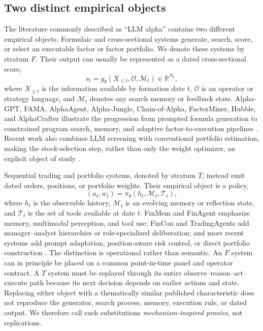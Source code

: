 \subsection{Two distinct empirical objects}

The literature commonly described as ``LLM alpha'' contains two different
empirical objects.  Formulaic and cross-sectional systems generate, search,
score, or select an executable factor or factor portfolio.  We denote these
systems by stratum \(F\).  Their output can usually be represented as a dated
cross-sectional score,
\[
    s_t = g_\theta(X_{\leq t},\mathcal{O},\mathcal{M}_t)
    \in \mathbb{R}^{N_t},
\]
where \(X_{\leq t}\) is the information available by formation date \(t\),
\(\mathcal{O}\) is an operator or strategy language, and \(\mathcal{M}_t\)
denotes any search memory or feedback state.  Alpha-GPT, FAMA, AlphaAgent,
Alpha-Jungle, Chain-of-Alpha, FactorMiner, Hubble, and AlphaCrafter illustrate
the progression from prompted formula generation to constrained program
search, memory, and adaptive factor-to-execution pipelines
\citep{li2023alphagpt,LiEtAl2024FAMA,TangEtAl2025AlphaAgent,shi2025alphajungle,cao2025chainofalpha,wang2026factorminer,shi2026hubble,yuan2026alphacrafter}.
Recent work also combines LLM screening with conventional portfolio
estimation, making the stock-selection step, rather than only the weight
optimizer, an explicit object of study \citep{caner2026agenticscreening}.

Sequential trading and portfolio systems, denoted by stratum \(T\), instead
emit dated orders, positions, or portfolio weights.  Their empirical object is
a policy,
\[
    (a_t,w_t) = \pi_\theta(h_t,\mathcal{M}_t,\mathcal{T}_t),
\]
where \(h_t\) is the observable history, \(\mathcal{M}_t\) is an evolving
memory or reflection state, and \(\mathcal{T}_t\) is the set of tools available
at date \(t\).  FinMem and FinAgent emphasize memory, multimodal perception,
and tool use; FinCon and TradingAgents add manager--analyst hierarchies or
role-specialized deliberation; and more recent systems add prompt adaptation,
position-aware risk control, or direct portfolio construction
\citep{YuEtAl2024FinMem,zhang2024finagent,YuEtAl2024FinCon,XiaoEtAl2024TradingAgents,papadakis2025atlas,tian2025tradinggroup,liu2025finpos,guo2025mass}.
The distinction is operational rather than semantic.  An \(F\) system can in
principle be placed on a common point-in-time panel and operator contract.  A
\(T\) system must be replayed through its entire observe--reason--act--execute
path because its next decision depends on earlier actions and state.  Replacing
either object with a thematically similar published characteristic does not
reproduce the generator, search process, memory, execution rule, or dated
output.  We therefore call such substitutions \emph{mechanism-inspired
proxies}, not replications.


